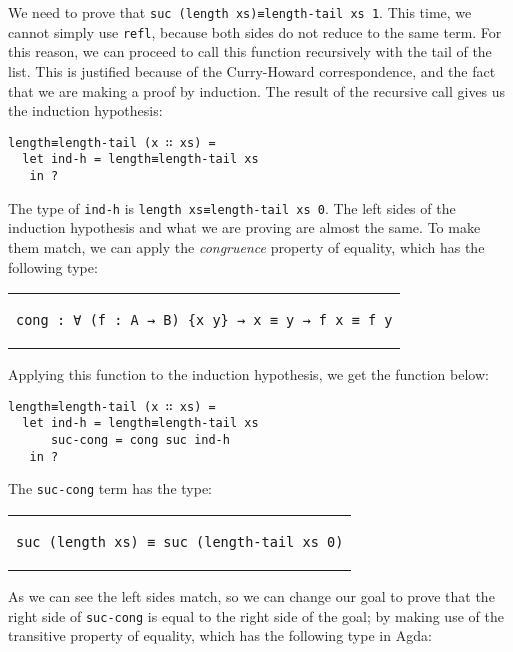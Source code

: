\documentclass[runningheads]{llncs}
\begin{document}
We need to prove that \lstinline{suc (length xs)≡length-tail xs 1}. This time, we cannot
simply use \lstinline{refl}, because both sides do not reduce to the same term. For this
reason, we can proceed to call this function recursively with the tail of the list. This
is justified because of the Curry-Howard correspondence, and the fact that we are making
a proof by induction. The result of the recursive call gives us the induction hypothesis:

\begin{lstlisting}
length≡length-tail (x ∷ xs) =
  let ind-h = length≡length-tail xs
   in ?
\end{lstlisting}

The type of \lstinline{ind-h} is \lstinline{length xs≡length-tail xs 0}. The left sides
of the induction hypothesis and what we are proving are almost the same. To make them
match, we can apply the \emph{congruence} property of equality, which has the following
type:

\begin{center}
\begin{tabular}{c}
\begin{lstlisting}
cong : ∀ (f : A → B) {x y} → x ≡ y → f x ≡ f y
\end{lstlisting}
\end{tabular}
\end{center}

Applying this function to the induction hypothesis, we get the function below:

\begin{lstlisting}
length≡length-tail (x ∷ xs) =
  let ind-h = length≡length-tail xs
      suc-cong = cong suc ind-h
   in ?
\end{lstlisting}

The \lstinline{suc-cong} term has the type:

\begin{center}
\begin{tabular}{c}
\begin{lstlisting}
suc (length xs) ≡ suc (length-tail xs 0)
\end{lstlisting}
\end{tabular}
\end{center}

As we can see the left sides match, so we can change our goal to prove that the right
side of \lstinline{suc-cong} is equal to the right side of the goal; by making use of the
transitive property of equality, which has the following type in Agda:
\end{document}
